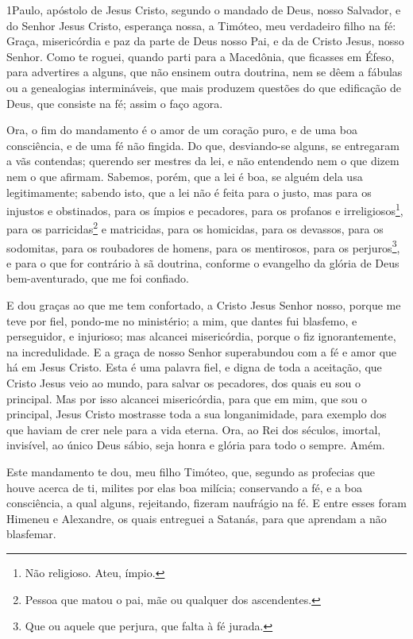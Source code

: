 
\lettrine{1} Paulo, apóstolo de Jesus Cristo, segundo o
mandado de Deus, nosso Salvador, e do Senhor Jesus Cristo, esperança
nossa, a Timóteo, meu verdadeiro filho na fé: Graça,
misericórdia e paz da parte de Deus nosso Pai, e da de Cristo Jesus,
nosso Senhor. Como te roguei, quando parti para a Macedônia, que
ficasses em Éfeso, para advertires a alguns, que não ensinem outra
doutrina, nem se dêem a fábulas ou a genealogias intermináveis,
que mais produzem questões do que edificação de Deus, que consiste
na fé; assim o faço agora.

Ora, o fim do mandamento é o amor de um coração puro, e de uma boa
consciência, e de uma fé não fingida. Do que, desviando-se
alguns, se entregaram a vãs contendas; querendo ser mestres da
lei, e não entendendo nem o que dizem nem o que afirmam.
Sabemos, porém, que a lei é boa, se alguém dela usa
legitimamente; sabendo isto, que a lei não é feita para o justo,
mas para os injustos e obstinados, para os ímpios e pecadores, para
os profanos e irreligiosos\footnote{Não religioso. Ateu, ímpio.},
para os parricidas\footnote{Pessoa que matou o pai, mãe ou qualquer
dos ascendentes.} e matricidas, para os homicidas, para os
devassos, para os sodomitas, para os roubadores de homens, para os
mentirosos, para os perjuros\footnote{Que ou aquele que perjura, que
falta à fé jurada.}, e para o que for contrário à sã doutrina,
conforme o evangelho da glória de Deus bem-aventurado, que me
foi confiado.

E dou graças ao que me tem confortado, a Cristo Jesus Senhor
nosso, porque me teve por fiel, pondo-me no ministério; a
mim, que dantes fui blasfemo, e perseguidor, e injurioso; mas
alcancei misericórdia, porque o fiz ignorantemente, na
incredulidade. E a graça de nosso Senhor superabundou com a
fé e amor que há em Jesus Cristo. Esta é uma palavra fiel, e
digna de toda a aceitação, que Cristo Jesus veio ao mundo, para
salvar os pecadores, dos quais eu sou o principal. Mas por
isso alcancei misericórdia, para que em mim, que sou o principal,
Jesus Cristo mostrasse toda a sua longanimidade, para exemplo dos
que haviam de crer nele para a vida eterna. Ora, ao Rei dos
séculos, imortal, invisível, ao único Deus sábio, seja honra e
glória para todo o sempre. Amém.

Este mandamento te dou, meu filho Timóteo, que, segundo as
profecias que houve acerca de ti, milites por elas boa milícia;
conservando a fé, e a boa consciência, a qual alguns,
rejeitando, fizeram naufrágio na fé. E entre esses foram
Himeneu e Alexandre, os quais entreguei a Satanás, para que aprendam
a não blasfemar.

